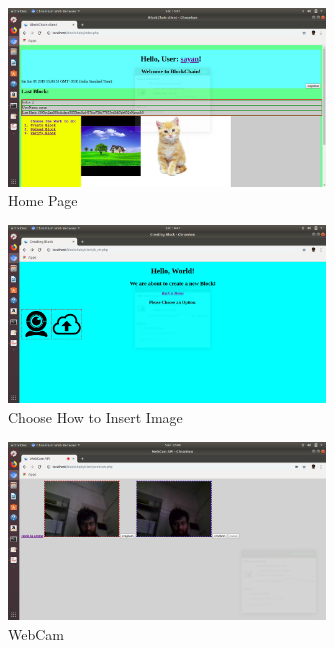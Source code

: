 \begin{figure}
\begin{center}
\includegraphics[width=0.75\textwidth]{./img_src/screen1.png}
\end{center}
\caption{Home Page}
\label{fig:homepage}
\end{figure}

\begin{figure}
\begin{center}
\includegraphics[width=0.75\textwidth]{./img_src/screen2.png}
\end{center}
\caption{Choose How to Insert Image}
\label{fig:img_insert}
\end{figure}

\begin{figure}
\begin{center}
\includegraphics[width=0.75\textwidth]{./img_src/screen3.png}
\end{center}
\caption{WebCam}
\label{fig:img_webcam}
\end{figure}

